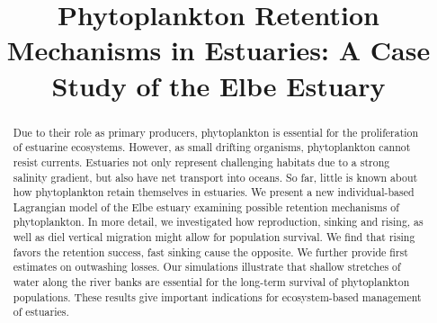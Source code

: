 \documentclass[npg, manuscript]{copernicus}
\begin{document}
\title{Phytoplankton Retention Mechanisms in Estuaries: A Case Study of the Elbe Estuary}
















\received{}
\pubdiscuss{} %
\revised{}
\accepted{}
\published{}




\maketitle



\begin{abstract}
    Due to their role as primary producers, phytoplankton is essential for the proliferation of estuarine ecosystems.
    However, as small drifting organisms, phytoplankton cannot resist currents.
    Estuaries not only represent challenging habitats due to a strong salinity gradient, but also have net transport into oceans.
    So far, little is known about how phytoplankton retain themselves in estuaries.
    We present a new individual-based Lagrangian model of the Elbe estuary examining possible retention mechanisms of phytoplankton. In more detail, we investigated how reproduction, sinking and rising, as well as diel vertical migration might allow for population survival. 
    We find that rising favors the retention success, fast sinking cause the opposite.
    We further provide first estimates on outwashing losses.
    Our simulations illustrate that shallow stretches of water along the river banks are essential for the long-term survival of phytoplankton populations.
    These results give important indications for ecosystem-based management of estuaries.
\end{abstract}
\end{document}
